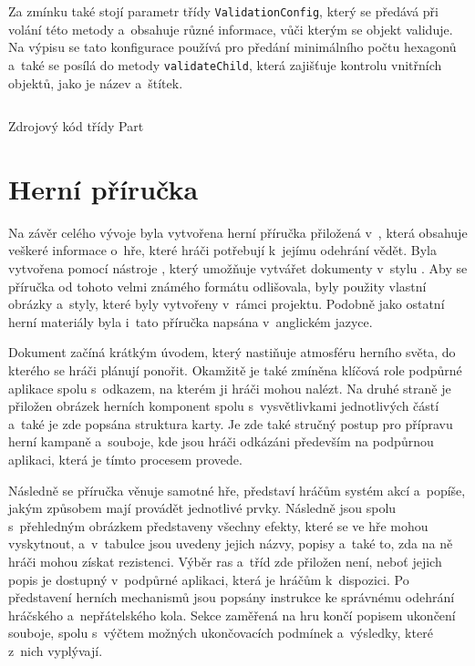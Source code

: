 Za zmínku také stojí parametr třídy  \texttt{ValidationConfig}, který se předává při volání této metody a~obsahuje různé informace, vůči kterým se objekt validuje. Na výpisu se tato konfigurace používá pro předání minimálního počtu hexagonů a~také se posílá do metody \texttt{validateChild}, která zajišťuje kontrolu vnitřních objektů, jako je název a~štítek.

\begin{listing}[H]
    \inputminted{Java}{code/Part.java}
    \caption{Zdrojový kód třídy Part}
    \label{code:part}
\end{listing}

\newpage
\section{Herní příručka}
\label{sec:game_manual}

Na závěr celého vývoje byla vytvořena herní příručka přiložená v~, která obsahuje veškeré informace o~hře, které hráči potřebují k~jejímu odehrání vědět. Byla vytvořena pomocí nástroje , který umožňuje vytvářet dokumenty v~stylu \dnd{}. Aby se příručka od tohoto velmi známého formátu odlišovala, byly použity vlastní obrázky a~styly, které byly vytvořeny v~rámci projektu. Podobně jako ostatní herní materiály byla i~tato příručka napsána v~anglickém jazyce.

Dokument začíná krátkým úvodem, který nastiňuje atmosféru herního světa, do kterého se hráči plánují ponořit. Okamžitě je také zmíněna klíčová role podpůrné aplikace spolu s~odkazem, na kterém ji hráči mohou nalézt. Na druhé straně je přiložen obrázek herních komponent spolu s~vysvětlivkami jednotlivých částí a~také je zde popsána struktura karty. Je zde také stručný postup pro přípravu herní kampaně a~souboje, kde jsou hráči odkázáni především na podpůrnou aplikaci, která je tímto procesem provede.

Následně se příručka věnuje samotné hře, představí hráčům systém akcí a~popíše, jakým způsobem mají provádět jednotlivé prvky. Následně jsou spolu s~přehledným obrázkem představeny všechny efekty, které se ve hře mohou vyskytnout, a~v~tabulce jsou uvedeny jejich názvy, popisy a~také to, zda na ně hráči mohou získat rezistenci. Výběr ras a~tříd zde přiložen není, neboť jejich popis je dostupný v~podpůrné aplikaci, která je hráčům k~dispozici. Po představení herních mechanismů jsou popsány instrukce ke správnému odehrání hráčského a~nepřátelského kola. Sekce zaměřená na hru končí popisem ukončení souboje, spolu s~výčtem možných ukončovacích podmínek a~výsledky, které z~nich vyplývají.

